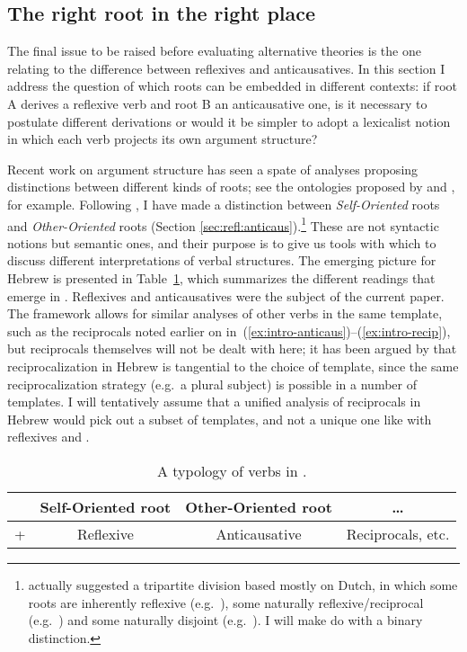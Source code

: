 	\subsection{The right root in the right place} \label{sec:disc:roots}
The final issue to be raised before evaluating alternative theories is the one relating to the difference between reflexives and anticausatives. In this section I address the question of which roots can be embedded in different contexts: if root A derives a reflexive verb and root B an anticausative one, is it necessary to postulate different derivations or would it be simpler to adopt a lexicalist notion in which each verb projects its own argument structure?

Recent work on argument structure has seen a spate of analyses proposing distinctions between different kinds of roots; see the ontologies proposed by \cite{elenasamioti14} and \cite{levinson14}, for example. Following \cite{alexiadouafto}, I have made a distinction between \emph{Self-Oriented} roots and \emph{Other-Oriented} roots (Section \ref{sec:refl:anticaus}).\footnote{\cite{alexiadouafto} actually suggested a tripartite division based mostly on Dutch, in which some roots are inherently reflexive (e.g.~), some naturally reflexive/reciprocal (e.g.~) and some naturally disjoint (e.g.~). I will make do with a binary distinction.} These are not syntactic notions but semantic ones, and their purpose is to give us tools with which to discuss different interpretations of verbal structures. The emerging picture for Hebrew is presented in Table~\ref{table:thit-roots}, which summarizes the different readings that emerge in \thit. Reflexives and anticausatives were the subject of the current paper. The framework allows for similar analyses of other verbs in the same template, such as the reciprocals noted earlier on in~(\ref{ex:intro-anticaus})--(\ref{ex:intro-recip}), but reciprocals themselves will not be dealt with here; it has been argued by \cite{barashersiegal16mmm} that reciprocalization in Hebrew is tangential to the choice of template, since the same reciprocalization strategy (e.g.~a plural subject) is possible in a number of templates. I will tentatively assume that a unified analysis of reciprocals in Hebrew would pick out a subset of templates, and not a unique one like with reflexives and {\thit}.

\begin{table}[h!t] \centering
	\begin{tabular}{l|c|c|c}
		& Self-Oriented root & Other-Oriented root & \dots \\\hline
		{\va} + {\vz} & Reflexive & Anticausative & Reciprocals, etc. \\ 
	\end{tabular}
	\caption{A typology of verbs in \thit.\label{table:thit-roots}}
\end{table}

